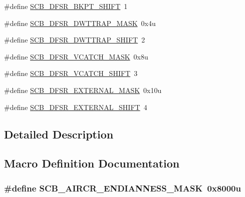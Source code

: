 \begin{DoxyCompactItemize}
$$\item 
\#define \hyperlink{group___s_c_b___register___masks_gab2da04235aa0df8d6d867336d1b2c9c5}{S\+C\+B\+\_\+\+D\+F\+S\+R\+\_\+\+B\+K\+P\+T\+\_\+\+S\+H\+I\+FT}~1
\item 
\#define \hyperlink{group___s_c_b___register___masks_gaa6d8e1428ddb9a650f965c33e09bad7a}{S\+C\+B\+\_\+\+D\+F\+S\+R\+\_\+\+D\+W\+T\+T\+R\+A\+P\+\_\+\+M\+A\+SK}~0x4u
\item 
\#define \hyperlink{group___s_c_b___register___masks_ga6a1d724f4fe22533bd37c3f5179d2219}{S\+C\+B\+\_\+\+D\+F\+S\+R\+\_\+\+D\+W\+T\+T\+R\+A\+P\+\_\+\+S\+H\+I\+FT}~2
\item 
\#define \hyperlink{group___s_c_b___register___masks_ga44491a07e0ef59bfe8f7797f03acfabd}{S\+C\+B\+\_\+\+D\+F\+S\+R\+\_\+\+V\+C\+A\+T\+C\+H\+\_\+\+M\+A\+SK}~0x8u
\item 
\#define \hyperlink{group___s_c_b___register___masks_gaa503bd566d848235828e742233b8ff20}{S\+C\+B\+\_\+\+D\+F\+S\+R\+\_\+\+V\+C\+A\+T\+C\+H\+\_\+\+S\+H\+I\+FT}~3
\item 
\#define \hyperlink{group___s_c_b___register___masks_ga938e2bfb90d14dba16b2dd249b6cdbdd}{S\+C\+B\+\_\+\+D\+F\+S\+R\+\_\+\+E\+X\+T\+E\+R\+N\+A\+L\+\_\+\+M\+A\+SK}~0x10u
\item 
\#define \hyperlink{group___s_c_b___register___masks_ga0c4c283537c78ec5650fd7eaaf8c9cd7}{S\+C\+B\+\_\+\+D\+F\+S\+R\+\_\+\+E\+X\+T\+E\+R\+N\+A\+L\+\_\+\+S\+H\+I\+FT}~4
\end{DoxyCompactItemize}


\subsection{Detailed Description}


\subsection{Macro Definition Documentation}
\subsubsection[{\texorpdfstring{S\+C\+B\+\_\+\+A\+I\+R\+C\+R\+\_\+\+E\+N\+D\+I\+A\+N\+N\+E\+S\+S\+\_\+\+M\+A\+SK}{SCB_AIRCR_ENDIANNESS_MASK}}]{\setlength{\rightskip}{0pt plus 5cm}\#define S\+C\+B\+\_\+\+A\+I\+R\+C\+R\+\_\+\+E\+N\+D\+I\+A\+N\+N\+E\+S\+S\+\_\+\+M\+A\+SK~0x8000u}\hypertarget{group___s_c_b___register___masks_gad1fa2d88f03b66dea86171ebb636d936}{}\label{group___s_c_b___register___masks_gad1fa2d88f03b66dea86171ebb636d936}


